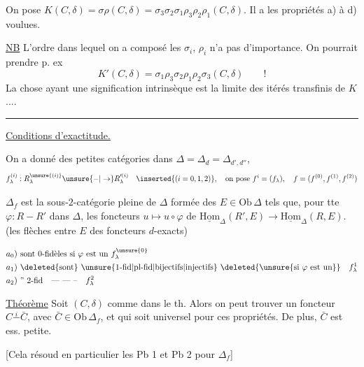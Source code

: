 On pose $K(C,\delta)=\sigma\rho(C,\delta)=\sigma_3\sigma_2\sigma_1\rho_3\rho_2\rho_1(C,\delta)$. Il a les propriétés a) à d) voulues.

\uline{NB} L'ordre dans lequel on a composé les  $\sigma_i$,  $\rho_i$ n'a pas d'importance. On pourrait prendre p. ex
\[
K'(C,\delta)=\sigma_1\rho_3\sigma_2\rho_1\rho_2\sigma_3(C,\delta)\qquad !
\]
La chose ayant une signification intrinsèque est la limite des  itérés transfinis de $K$....

\begin{center}\rule{1.1cm}{0.4pt}\end{center}

\uline{Conditions d'exactitude.}

On a donné  des petites catégories dans $\Delta=\Delta_d=\Delta_{d',d''}$, 
\[
f^{(i)}_\lambda:R^{\unsure{(i)}}_\lambda\unsure{-|\to}R^{\prime(i)}_\lambda\quad\inserted{(i=0,1,2)},\quad\text{on pose } f^i=(f_\lambda),\quad f=(f^{(0)},f^{(1)},f^{(2)})
\]

$\Delta_f$ est la sous-$2$-catégorie pleine de $\Delta$ formée des $E\in\mathrm{Ob}\,\Delta$ tels que,  pour tte $\varphi:R-R'$ dans $\Delta$, les foncteurs $u\longmapsto u\circ\varphi$ de $\underline{\mathrm{Hom}}_\Delta(R',E)\longrightarrow\underline{\mathrm{Hom}}_\Delta(R,E)$. (les flèches entre $E$  des foncteurs $d$-exacts)

\[
\begin{aligned}
a_0)&\ \text{sont 0-fidèles si }\varphi\text{ est un } f_\lambda^{\unsure{0}}\\
a_1)&\ \deleted{\text{sont}}\ \unsure{\text{1-fid}|\text{pl-fid}|\text{bijectifs}|\text{injectifs}}\ \deleted{\unsure{\text{si }\varphi\text{ est un}}}\quad f_\lambda^1\\
a_2)&\ \text{'' 2-fid}\quad\text{--- --- --}\quad f_\lambda^2
\end{aligned}
\]

\uline{Théorème}  Soit $(C,\delta)$ comme dans le th. Alors on peut trouver un foncteur  $C\overset{i}{-}\bar C$, avec $\bar C\in\mathrm{Ob}\,\Delta_f$, et qui soit universel pour ces propriétés. De plus, $\bar C$ est ess. petite.

[Cela résoud en particulier les Pb 1 et Pb 2  pour $\Delta_f$]

